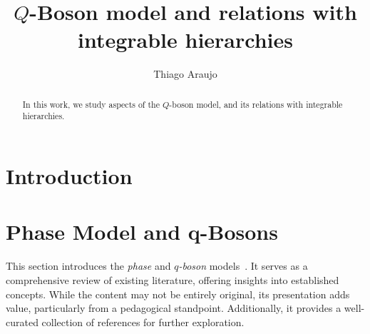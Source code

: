 \documentclass[a4paper,11pt]{amsart}
\begin{document}

\title{\(Q\)-Boson model and relations with integrable hierarchies}

\author{Thiago Araujo}

\address{\noindent 
Instituto de Física Teórica, UNESP-Universidade Estadual Paulista,
R. Dr. Bento T. Ferraz 271, Bl. II, Sao Paulo 01140-070, SP, Brazil\\
\&
Instituto de Física, Universidade de S\~ao Paulo,
Rua do Matão Travessa 1371, 05508-090 São Paulo, SP. Brazil
}


\begin{abstract}
In this work, we study aspects of the \(Q\)-boson model, and 
its relations with integrable hierarchies. 
\end{abstract}

\maketitle

\setcounter{tocdepth}{2}
\tableofcontents

\section{Introduction}




\section{Phase Model and q-Bosons}

This section introduces the \emph{phase} and \emph{\(q\)-boson}
models~\cite{Bogoliubov:1992, Bogoliubov:1997soj, Bogoliubov2005,
  Tsilevich:2006}. It serves as a comprehensive review of existing
literature, offering insights into established concepts. While the
content may not be entirely original, its presentation adds value,
particularly from a pedagogical standpoint. Additionally, it provides
a well-curated collection of references for further exploration.
\end{document}
